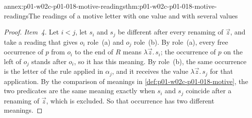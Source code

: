 \begin{annexitem}{annex:p01-w02c-p01-018-motive-readings}{thm:p01-w02c-p01-018-motive-readings}{The readings of a motive letter with one value and with several values}
\begin{proof}
\emph{Item~4.}  Let \(i<j\), let \(s_i\) and \(s_j\) be different after
every renaming of \(\vec z\), and take a reading that gives \(o_i\)
role~(a) and \(o_j\) role~(b).  By role~(a), every free occurrence of \(p\)
from \(o_i\) to the end of \(R\) means \(\lambda\vec z.\,s_i\); the
occurrence of \(p\) on the left of \(o_j\) stands after \(o_i\), so it has
this meaning.  By role~(b), the same occurrence is the letter of the rule
applied in \(\alpha_j\), and it receives the value
\(\lambda\vec z.\,s_j\) for that application.  By the comparison of
meanings in \cref{def:p01-w02c-p01-018-motive}, the two predicates are the
same meaning exactly when \(s_i\) and \(s_j\) coincide after a renaming of
\(\vec z\), which is excluded.  So that occurrence has two different
meanings.
\end{proof}
\end{annexitem}

